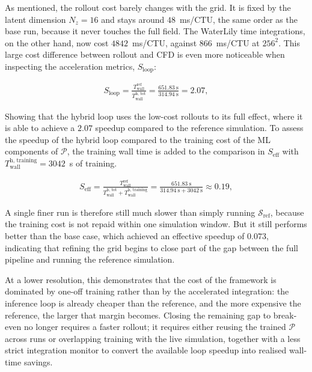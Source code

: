 As mentioned, the rollout cost barely changes with the grid. It is fixed by the latent dimension $N_z = 16$ and stays around $48$~ms/CTU, the same order as the base run, because it never touches the full field. The WaterLily time integrations, on the other hand, now cost $4842$~ms/CTU, against $866$~ms/CTU at $256^2$. This large cost difference between rollout and CFD is even more noticeable when inspecting the acceleration metrics, $S_\text{loop}$: 


\begin{align}
  S_\text{loop} = \frac{T_\text{wall}^\text{ref}}{T_\text{wall}^\text{h, tot}}
  = \frac{\SI{651.83}{\second}}{\SI{314.94}{\second}} = 2.07,
\end{align}

Showing that the hybrid loop uses the low-cost rollouts to its full effect, where it is able to achieve a $2.07$ speedup compared to the reference simulation. To assess the speedup of the hybrid loop compared to the training cost of the ML components of $\mathcal{P}$, the training wall time is added to the comparison in $S_\text{eff}$ with $T_\text{wall}^\text{h, training} = 3042$~s of training.


\begin{align}
  S_\text{eff}
  = \frac{T_\text{wall}^\text{ref}}{T_\text{wall}^\text{h, tot} + T_\text{wall}^\text{h, training}}
  = \frac{\SI{651.83}{\second}}{\SI{314.94}{\second} + \SI{3042}{\second}} \approx 0.19,
\end{align}

A single finer run is therefore still much slower than simply running $\mathcal{S}_\text{ref}$, because the training cost is not repaid within one simulation window. But it still performs better than the base case, which achieved an effective speedup of $0.073$, indicating that refining the grid begins to close part of the gap between the full pipeline and running the reference simulation. 

At a lower resolution, this demonstrates that the cost of the framework is dominated by one-off training rather than by the accelerated integration: the inference loop is already cheaper than the reference, and the more expensive the reference, the larger that margin becomes. Closing the remaining gap to break-even no longer requires a faster rollout; it requires either reusing the trained $\mathcal{P}$ across runs or overlapping training with the live simulation, together with a less strict integration monitor to convert the available loop speedup into realised wall-time savings.

